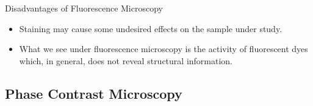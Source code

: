 \begin{frame}{Disadvantages of Fluorescence Microscopy}
	\begin{itemize}
		\item<1-> Staining may cause some undesired effects on the sample under study.
		\item<2-> What we see under fluorescence microscopy is the activity of fluorescent dyes which, in general, does not reveal structural information.
	\end{itemize}
\end{frame}


\subsection{Phase Contrast Microscopy}%
\label{sub:phase_contrast_microscopy}



